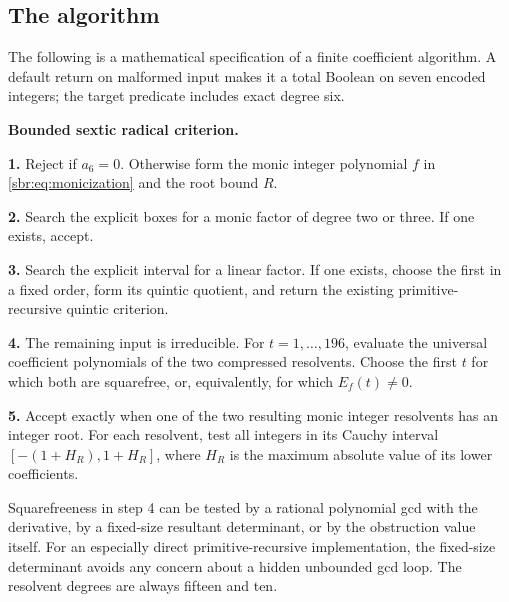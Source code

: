 \documentclass[11pt,letterpaper]{article}
\numberwithin{equation}{section}
\theoremstyle{definition}
\theoremstyle{remark}
\begin{document}
\subsection{The algorithm}

The following is a mathematical specification of a finite coefficient
algorithm. A default return on malformed input makes it a total Boolean
on seven encoded integers; the target predicate includes exact degree six.

\begin{resultbox}
\textbf{Bounded sextic radical criterion.}

\textbf{1.} Reject if $a_6=0$. Otherwise form the monic integer polynomial
$f$ in \cref{sbr:eq:monicization} and the root bound $R$.

\textbf{2.} Search the explicit boxes for a monic factor of degree two or
three. If one exists, accept.

\textbf{3.} Search the explicit interval for a linear factor. If one
exists, choose the first in a fixed order, form its quintic quotient,
and return the existing primitive-recursive quintic criterion.

\textbf{4.} The remaining input is irreducible. For $t=1,\ldots,196$,
evaluate the universal coefficient polynomials of the two compressed
resolvents. Choose the first $t$ for which both are squarefree, or,
equivalently, for which $E_f(t)\ne0$.

\textbf{5.} Accept exactly when one of the two resulting monic integer
resolvents has an integer root. For each resolvent, test all integers in
its Cauchy interval $[-(1+H_R),1+H_R]$, where $H_R$ is the maximum absolute
value of its lower coefficients.
\end{resultbox}

Squarefreeness in step 4 can be tested by a rational polynomial gcd with
the derivative, by a fixed-size resultant determinant, or by the
obstruction value itself. For an especially direct primitive-recursive
implementation, the fixed-size determinant avoids any concern about a
hidden unbounded gcd loop. The resolvent degrees are always fifteen and
ten.
\end{document}
